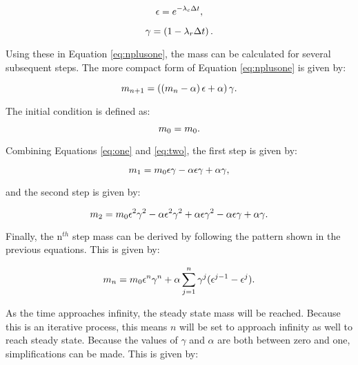 \begin{equation} \hfill
\epsilon = e^{-\lambda_c \Delta t},
\hfill \end{equation}

\begin{equation} \hfill
\gamma = \left(1 - {\lambda_r \Delta t} \right).
\hfill \end{equation}

Using these in Equation \eqref{eq:nplusone}, the mass can be calculated for several subsequent steps.
The more compact form of Equation \eqref{eq:nplusone} is given by:

\begin{equation} \hfill
m_{n+1} = \left(\left(m_n - \alpha \right) \epsilon  + \alpha\right) \gamma.
\hfill \label{eq:one} \end{equation}

The initial condition is defined as:

\begin{equation} \hfill
m_0 = m_0.
\hfill \label{eq:two} \end{equation}

Combining Equations \eqref{eq:one} and \eqref{eq:two}, the first step is given by:

\begin{equation} \hfill
m_1 = m_0 \epsilon \gamma - \alpha \epsilon \gamma + \alpha \gamma,
\hfill \end{equation}

and the second step is given by:

\begin{equation} \hfill
m_2 = m_0 \epsilon^2 \gamma^2 - \alpha \epsilon^2 \gamma^2 + \alpha \epsilon \gamma^2 - \alpha \epsilon \gamma + \alpha \gamma.
\hfill \end{equation}

Finally, the n$^{th}$ step mass can be derived by following the pattern shown in the previous equations.
This is given by:

\begin{equation} \hfill
m_n = m_0 \epsilon^n \gamma^n + \alpha \sum_{j=1}^n \gamma^j (\epsilon^{j-1} - \epsilon^j).
\hfill \end{equation}

As the time approaches infinity, the steady state mass will be reached.
Because this is an iterative process, this means $n$ will be set to approach infinity as well to reach steady state.
Because the values of $\gamma$ and $\alpha$ are both between zero and one, simplifications can be made.
This is given by:

